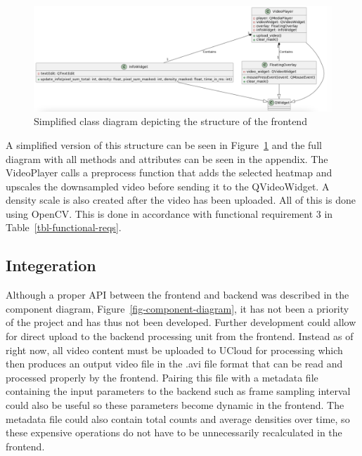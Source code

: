 \documentclass[
]{article}
\begin{document}
\begin{figure}

{\centering \includegraphics{../images/class-diagram-frontend.png}

}

\caption{\label{fig-fcd}Simplified class diagram depicting the structure
of the frontend}

\end{figure}

A simplified version of this structure can be seen in
Figure~\ref{fig-fcd} and the full diagram with all methods and
attributes can be seen in the appendix. The VideoPlayer calls a
preprocess function that adds the selected heatmap and upscales the
downsampled video before sending it to the QVideoWidget. A density scale
is also created after the video has been uploaded. All of this is done
using OpenCV. This is done in accordance with functional requirement 3
in Table~\ref{tbl-functional-reqs}.

\hypertarget{integeration}{%
\subsection{Integeration}\label{integeration}}

Although a proper API between the frontend and backend was described in
the component diagram, Figure~\ref{fig-component-diagram}, it has not
been a priority of the project and has thus not been developed. Further
development could allow for direct upload to the backend processing unit
from the frontend. Instead as of right now, all video content must be
uploaded to UCloud for processing which then produces an output video
file in the .avi file format that can be read and processed properly by
the frontend. Pairing this file with a metadata file containing the
input parameters to the backend such as frame sampling interval could
also be useful so these parameters become dynamic in the frontend. The
metadata file could also contain total counts and average densities over
time, so these expensive operations do not have to be unnecessarily
recalculated in the frontend.
\end{document}
